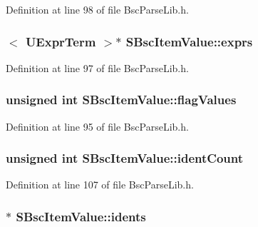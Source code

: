 Definition at line 98 of file BscParseLib.h.\hypertarget{struct_s_bsc_item_value_41b187a9f9498a0897dd15e3e436dd09}{
\subsubsection[{exprs}]{$<$ {\bf UExprTerm} $>$$\ast$ {\bf SBscItemValue::exprs}}}
\label{struct_s_bsc_item_value_41b187a9f9498a0897dd15e3e436dd09}




Definition at line 97 of file BscParseLib.h.\hypertarget{struct_s_bsc_item_value_ced6e9051d3dcdf6d0aa6c56e90b1aff}{
\subsubsection[{flagValues}]{\setlength{\rightskip}{0pt plus 5cm}unsigned int {\bf SBscItemValue::flagValues}}}
\label{struct_s_bsc_item_value_ced6e9051d3dcdf6d0aa6c56e90b1aff}




Definition at line 95 of file BscParseLib.h.\hypertarget{struct_s_bsc_item_value_561bad8d70319d99bb4db636af6b1336}{
\subsubsection[{identCount}]{\setlength{\rightskip}{0pt plus 5cm}unsigned int {\bf SBscItemValue::identCount}}}
\label{struct_s_bsc_item_value_561bad8d70319d99bb4db636af6b1336}




Definition at line 107 of file BscParseLib.h.\hypertarget{struct_s_bsc_item_value_5484a3895096610e2adee2ed158f9184}{
\subsubsection[{idents}]{$\ast$ {\bf SBscItemValue::idents}}}
\label{struct_s_bsc_item_value_5484a3895096610e2adee2ed158f9184}




